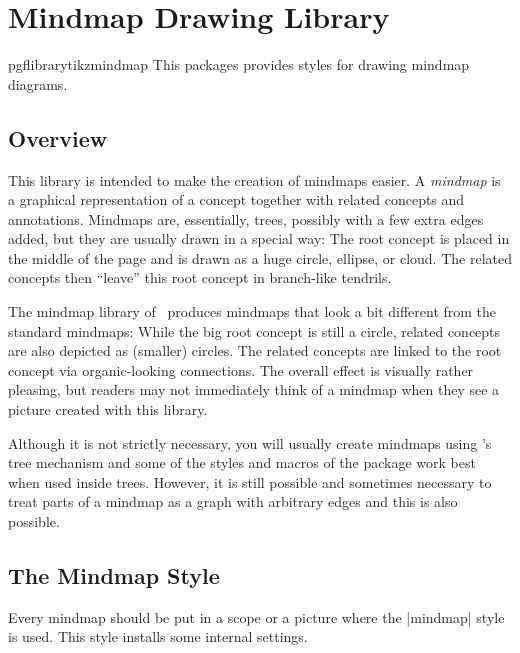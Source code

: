 \section{Mindmap Drawing Library}

\begin{package}{pgflibrarytikzmindmap}
  This packages provides styles for drawing mindmap diagrams.
\end{package}

\subsection{Overview}

This library is intended to make the creation of mindmaps easier. A
\emph{mindmap} is a graphical representation of a concept together
with related concepts and annotations. Mindmaps are, essentially,
trees, possibly with a few extra edges added, but they are usually
drawn in a special way: The root concept is placed in the middle of
the page and is drawn as a huge circle, ellipse, or cloud. The related
concepts then ``leave'' this root concept in branch-like tendrils.

The mindmap library of \tikzname\ produces mindmaps that look a bit
different from the standard mindmaps: While the big root concept is
still a circle, related concepts are also depicted as (smaller)
circles. The related concepts are linked to the root concept via
organic-looking connections. The overall effect is visually rather
pleasing, but readers may not immediately think of a mindmap when they
see a picture created with this library.

Although it is not strictly necessary, you will usually create
mindmaps using \tikzname's tree mechanism and some of the styles and
macros of the package work best when used inside trees. However, it is
still possible and sometimes necessary to treat parts of a mindmap as
a graph with arbitrary edges and this is also possible.


\subsection{The Mindmap Style}

Every mindmap should be put in a scope or a picture where the
|mindmap| style is used. This style installs some internal settings.

